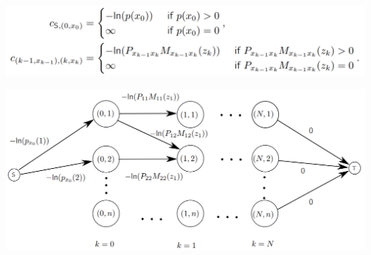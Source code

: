 \documentclass[10pt,landscape]{article}
\newenvironment{Figure}
{\par\medskip\noindent\minipage{\linewidth}}
{\endminipage\par\medskip}
\begin{document}
\begin{multicols*}{4}
%

\begin{Figure}
	\centering
	\includegraphics[width=\linewidth]{pictures/Viterbi_1.png}
\end{Figure}
\begin{Figure}
	\centering
	\includegraphics[width=\linewidth]{pictures/Viterbi_2.png}
\end{Figure}



\end{multicols*}
\end{document}
